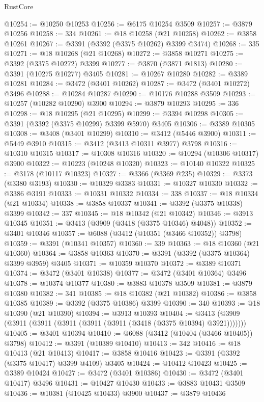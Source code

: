 \begin{lexlean}{RustCore}
\begin{coremodule}
@10254 := @10250 @10253
@10256 := @6175 @10254 @3509
@10257 := @3879 @10256
@10258 := 334
@10261 := @18 @10258 (@21 @10258)
@10262 := @3858 @10261
@10267 := @3391 (@3392 (@3375 @10262) @3399 @3474)
@10268 := 335
@10271 := @18 @10268 (@21 @10268)
@10272 := @3858 @10271
@10275 := @3392 (@3375 @10272) @3399
@10277 := @3870 (@3871 @1813)
@10280 := @3391 (@10275 @10277) @3405
@10281 := @10267 @10280
@10282 := @3389 @10281
@10284 := @3472 (@3401 @10262)
@10287 := @3472 (@3401 @10272) @3496
@10288 := @10284 @10287
@10290 := @10176 @10288 @3509
@10293 := @10257 (@10282 @10290) @3900
@10294 := @3879 @10293
@10295 := 336
@10298 := @18 @10295 (@21 @10295)
@10299 := @3394 @10298
@10305 := @3391 (@3392 (@3375 @10299) @3399 @5970) @3405
@10306 := @3389 @10305
@10308 := @3408 (@3401 @10299)
@10310 := @3412 (@5446 @3900)
@10311 := @5449 @3910
@10315 := @3412 (@3413 @10311 @3977) @3798
@10316 := @10310 @10315
@10317 := @10308 @10316
@10320 := @10294 (@10306 @10317) @3900
@10322 := @10223 (@10248 @10320)
@10323 := @10140 @10322
@10325 := @3178 (@10117 @10323)
@10327 := @3366 (@3369 @235)
@10329 := @3373 (@3380 @3193)
@10330 := @10329 @3383
@10331 := @10327 @10330
@10332 := @3386 @3191
@10333 := @10331 @10332
@10334 := 338
@10337 := @18 @10334 (@21 @10334)
@10338 := @3858 @10337
@10341 := @3392 (@3375 @10338) @3399
@10342 := 337
@10345 := @18 @10342 (@21 @10342)
@10346 := @3913 @10345
@10351 := @3413 (@3909 (@3418 (@3375 @10346) @4048))
@10352 := @3401 @10346
@10357 := @6088 (@3412 (@10351 (@3466 @10352)) @3798)
@10359 := @3391 (@10341 @10357)
@10360 := 339
@10363 := @18 @10360 (@21 @10360)
@10364 := @3858 @10363
@10370 := @3391 (@3392 (@3375 @10364) @3399 @3959) @3405
@10371 := @10359 @10370
@10372 := @3389 @10371
@10374 := @3472 (@3401 @10338)
@10377 := @3472 (@3401 @10364) @3496
@10378 := @10374 @10377
@10380 := @3883 @10378 @3509
@10381 := @3879 @10380
@10382 := 341
@10385 := @18 @10382 (@21 @10382)
@10386 := @3858 @10385
@10389 := @3392 (@3375 @10386) @3399
@10390 := 340
@10393 := @18 @10390 (@21 @10390)
@10394 := @3913 @10393
@10404 := @3413 (@3909 (@3911 (@3911 (@3911 (@3911 (@3911 (@3418 (@3375 @10394) @3921)))))))
@10405 := @3401 @10394
@10410 := @6088 (@3412 (@10404 (@3466 @10405)) @3798)
@10412 := @3391 (@10389 @10410)
@10413 := 342
@10416 := @18 @10413 (@21 @10413)
@10417 := @3858 @10416
@10423 := @3391 (@3392 (@3375 @10417) @3399 @4109) @3405
@10424 := @10412 @10423
@10425 := @3389 @10424
@10427 := @3472 (@3401 @10386)
@10430 := @3472 (@3401 @10417) @3496
@10431 := @10427 @10430
@10433 := @3883 @10431 @3509
@10436 := @10381 (@10425 @10433) @3900
@10437 := @3879 @10436

\end{coremodule}
\end{lexlean}
